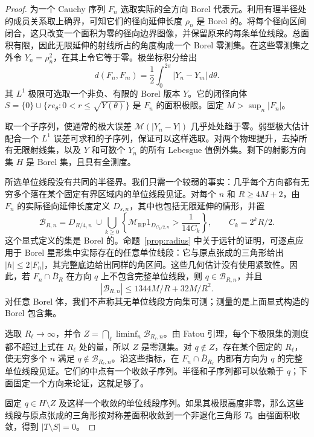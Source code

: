 \begin{proof}
为一个 Cauchy 序列 $F_n$ 选取实际的全方向 Borel 代表元。利用有理半径处的成员关系取上确界，可知它们的径向延伸长度 $\rho_n$ 是 Borel 的。将每个径向区间闭合，这只改变一个面积为零的径向边界图像，并保留原来的每条单位线段。总面积有限，因此无限延伸的射线所占的角度构成一个 Borel 零测集。在这些零测集之外令 $Y_n=\rho_n^2$，在其上令它等于零。极坐标积分给出
\[
 d(F_n,F_m)=\frac12\int_0^{2\pi}|Y_n-Y_m|\,d\theta.
\]
其 $L^1$ 极限可选取一个非负、有限的 Borel 版本 $Y$。它的闭径向体 $S=\{0\}\cup\{re_\theta:0<r\le\sqrt{Y(\theta)}\}$ 是 $F_n$ 的面积极限。固定 $M>\sup_n|F_n|$。

取一个子序列，使通常的极大误差 $\mathcal M(|Y_n-Y|)$ 几乎处处趋于零。弱型极大估计配合一个 $L^1$ 误差可求和的子序列，保证可以这样选取。对两个物理提升，去掉所有无限射线集，以及 $Y$ 和可数个 $Y_n$ 的所有 Lebesgue 值例外集。剩下的射影方向集 $H$ 是 Borel 集，且具有全测度。

所选单位线段没有共同的半径界。我们只需一个较弱的事实：几乎每个方向都有无穷多个落在某个固定有界区域内的单位线段见证。对每个 $n$ 和 $R\ge4M+2$，由 $F_n$ 的实际径向延伸长度定义 $D_{s,n}$，其中也包括无限延伸的情形，并置
\[
 \mathcal B_{R,n}=D_{R/4,n}\ \cup\!\bigcup_{k\ge0}
 \left\{\mathcal M_{\mathrm{RP}}1_{D_{C_k/2,n}}>\frac1{14C_k}\right\},
 \qquad C_k=2^kR/2.
\]
这个显式定义的集是 Borel 的。命题~\ref{prop:radius} 中关于远针的证明，可逐点应用于 Borel 星形集中实际存在的任意单位线段：它与原点张成的三角形给出 $|h|\le2|F_n|$，其完整底边给出同样的角区间。这些几何估计没有使用紧致性。因此，若 $F_n\cap\overline B_R$ 在方向 $q$ 上不包含完整单位线段，则 $q\in\mathcal B_{R,n}$，并且
\[
 |\mathcal B_{R,n}|\le1344M/R+32M/R^2.
\]
对任意 Borel 体，我们不声称其无单位线段方向集可测；测量的是上面显式构造的 Borel 包含集。

选取 $R_\ell\to\infty$，并令 $Z=\bigcap_\ell\liminf_n\mathcal B_{R_\ell,n}$。由 Fatou 引理，每个下极限集的测度都不超过上式在 $R_\ell$ 处的量，所以 $Z$ 是零测集。对 $q\notin Z$，存在某个固定的 $R_\ell$，使无穷多个 $n$ 满足 $q\notin\mathcal B_{R_\ell,n}$。沿这些指标，在 $F_n\cap\overline B_{R_\ell}$ 内都有方向为 $q$ 的完整单位线段见证。它们的中点有一个收敛子序列。半径和子序列都可以依赖于 $q$；下面固定一个方向来论证，这就足够了。

固定 $q\in H\setminus Z$ 及这样一个收敛的单位线段序列。如果其极限高度非零，那么这些线段与原点张成的三角形按对称差面积收敛到一个非退化三角形 $T$。由强面积收敛，得到 $|T\setminus S|=0$。


\end{proof}
